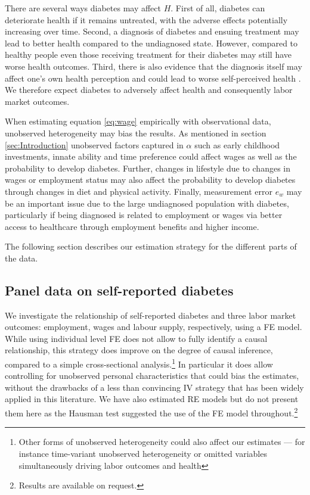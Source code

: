 \documentclass[12pt,english]{article}
\begin{document}
There are several ways diabetes may affect $H$. First of all, diabetes can deteriorate health if it remains untreated, with the adverse effects potentially increasing over time. Second, a diagnosis of diabetes and ensuing treatment may lead to better health compared to the undiagnosed state. However, compared to healthy people even those receiving treatment for their diabetes may still have worse health outcomes. Third, there is also evidence that the diagnosis itself may affect one's own health perception and could lead to worse self-perceived health \parencite{Thoolen2006}. We therefore expect diabetes to adversely affect health and consequently labor market outcomes.

When estimating equation  \ref{eq:wage} empirically with observational data, unobserved heterogeneity may bias the results. As mentioned in section  \ref{sec:Introduction} unobserved factors captured in $\alpha$ such as early childhood investments, innate ability and time preference could affect wages as well as the probability to develop diabetes. Further, changes in lifestyle due to changes in wages or employment status may also affect the probability to develop diabetes through changes in diet and physical activity. Finally, measurement error $e_w$ may be an important issue due to the large undiagnosed population with diabetes, particularly if being diagnosed is related to employment or wages via better access to healthcare through employment benefits and higher income.

The following section describes our estimation strategy for the different parts of the data.


\subsection{Panel data on self-reported diabetes}

We investigate the relationship of self-reported diabetes and three
labor market outcomes: employment, wages and labour supply, respectively, using a \ac{FE} model. While using individual level \ac{FE} does not allow to fully identify a causal relationship, this strategy does improve on the degree of causal inference, compared to a simple cross-sectional analysis.\footnote{Other forms of unobserved heterogeneity could also affect our estimates --- for instance time-variant unobserved heterogeneity or omitted variables simultaneously driving labor outcomes and health} In particular it does allow controlling for unobserved personal characteristics that could bias the estimates, without the drawbacks of a less than convincing \ac{IV} strategy that has been widely applied in this literature. We have also estimated \ac{RE} models but do not present them here as the Hausman test suggested the use of the \ac{FE} model throughout.\footnote{Results are available on request.}
\end{document}
